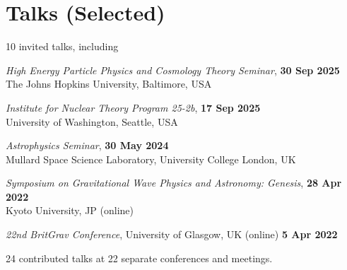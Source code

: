 \newcommand{\playsymbol}{$\blacktriangleright$}

\section{Talks (Selected)}

10 invited talks, including
%
\begin{etaremune}
    \item \textit{High Energy Particle Physics and Cosmology Theory Seminar},
    \hfill \textbf{30 Sep 2025} \\
    The Johns Hopkins University, Baltimore, USA
    \item \textit{Institute for Nuclear Theory Program 25-2b},
    \hfill \textbf{17 Sep 2025} \\
    University of Washington, Seattle, USA
    \item \textit{Astrophysics Seminar}, \hfill \textbf{30 May 2024} \\
    Mullard Space Science Laboratory, University College London, UK
    \item
    \textit{Symposium on Gravitational Wave Physics and Astronomy: Genesis},
    \hfill \textbf{28 Apr 2022} \\
    Kyoto University, JP (online)
    \item \textit{22nd BritGrav Conference}, University of Glasgow, UK (online)
    \hfill \textbf{5 Apr 2022}
\end{etaremune}
%
24 contributed talks at 22 separate conferences and meetings.


